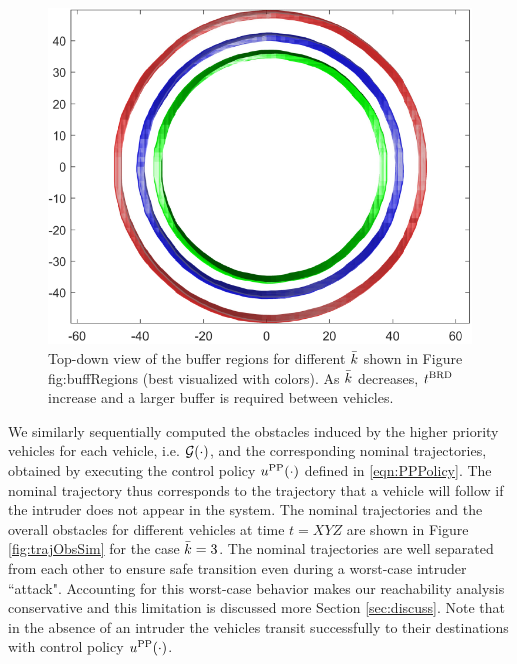 \begin{figure}[H]
  \centering
  \includegraphics[width=\columnwidth]{"figs/bufferRegions_topdown"}
  \caption{Top-down view of the buffer regions for different $\bar{k}$ shown in Figure {fig:buffRegions} (best visualized with colors). As $\bar{k}$ decreases, $t^\text{BRD}$ increase and a larger buffer is required between vehicles.}
  \label{fig:buffRegions_td}
\end{figure}

We similarly sequentially computed the obstacles induced by the higher priority vehicles for each vehicle, i.e. $\mathcal{G}(\cdot)$, and the corresponding nominal trajectories, obtained by executing the control policy $u^{\text{PP}}(\cdot)$ defined in \eqref{eqn:PPPolicy}. The nominal trajectory thus corresponds to the trajectory that a vehicle will follow if the intruder does not appear in the system. The nominal trajectories and the overall obstacles for different vehicles at time $t = XYZ$ are shown in Figure \ref{fig:trajObsSim} for the case $\bar{k} = 3$. The nominal trajectories are well separated from each other to ensure safe transition even during a worst-case intruder ``attack". Accounting for this worst-case behavior makes our reachability analysis  conservative and this limitation is discussed more Section \ref{sec:discuss}. Note that in the absence of an intruder the vehicles transit successfully to their destinations with control policy $u^{\text{PP}}(\cdot)$.

